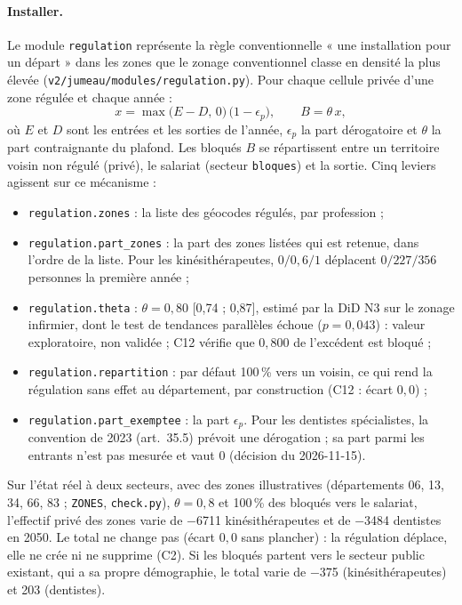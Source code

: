 \paragraph{Installer.} Le module \texttt{regulation} représente la règle conventionnelle « une installation
pour un départ » dans les zones que le zonage conventionnel classe en densité la plus élevée (\texttt{v2/jumeau/modules/regulation.py}). Pour chaque cellule
privée d'une zone régulée et chaque année :
\begin{equation}\label{jum:eq:regulation}
  x = \max\bigl(E - D,\, 0\bigr)\,\bigl(1 - \epsilon_p\bigr), \qquad B = \theta\, x,
\end{equation}
où $E$ et $D$ sont les entrées et les sorties de l'année, $\epsilon_p$ la part dérogatoire et $\theta$ la part
contraignante du plafond. Les bloqués $B$ se répartissent entre un territoire voisin non régulé (privé), le
salariat (secteur \texttt{bloques}) et la sortie. Cinq leviers agissent sur ce mécanisme :
\begin{itemize}
  \item \texttt{regulation.zones} : la liste des géocodes régulés, par profession ;
  \item \texttt{regulation.part\_zones} : la part des zones listées qui est retenue, dans l'ordre de la liste. Pour
        les kinésithérapeutes, $0 / 0{,}6 / 1$ déplacent $0 / 227 / 356$\mesure{} personnes la première année ;
  \item \texttt{regulation.theta} : $\theta = 0{,}80$\suppose{} [0,74 ; 0,87], estimé par la DiD N3 sur le zonage
        infirmier, dont le test de tendances parallèles échoue ($p = 0{,}043$) : valeur exploratoire, non
        validée ; C12 vérifie que $0{,}800$\mesure{} de l'excédent est bloqué ;
  \item \texttt{regulation.repartition} : par défaut 100\suppose{}\,\% vers un voisin, ce qui rend la régulation
        sans effet au département, par construction (C12 : écart $0{,}0$\mesure{}) ;
  \item \texttt{regulation.part\_exemptee} : la part $\epsilon_p$. Pour les dentistes spécialistes, la convention
        de 2023 (art.~35.5) prévoit une dérogation ; sa part parmi les entrants n'est pas mesurée et vaut
        0\suppose{} (décision du 2026-11-15).
\end{itemize}
Sur l'état réel à deux secteurs, avec des zones illustratives (départements 06, 13, 34, 66, 83 ;
\texttt{ZONES}, \texttt{check.py}), $\theta = 0{,}8$ et 100\,\% des bloqués vers le salariat, l'effectif privé des
zones varie de \num{-6711}\mesure{} kinésithérapeutes et de \num{-3484}\mesure{} dentistes en 2050. Le total ne change pas
(écart $0{,}0$\mesure{} sans plancher) : la régulation déplace, elle ne crée ni ne supprime (C2). Si les bloqués
partent vers le secteur public existant, qui a sa propre démographie, le total varie de \num{-375}\mesure{}
(kinésithérapeutes) et \num{+203}\mesure{} (dentistes).

